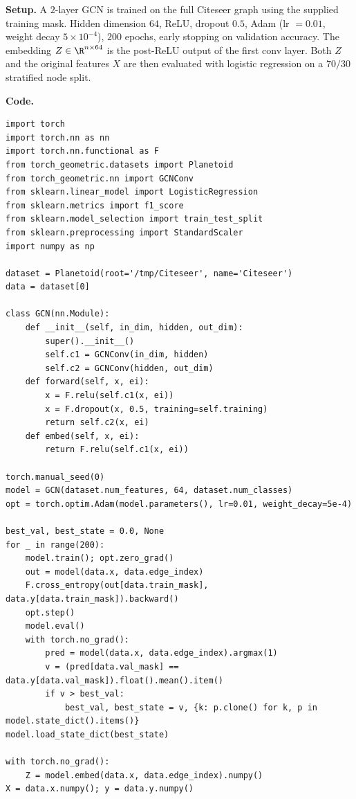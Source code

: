 \documentclass{article}
\begin{document}
\begin{tcolorbox}[colback=white, colframe=black!75, breakable, title=\textbf{Solution to Exercise 1}]
\textbf{Setup.} A $2$-layer GCN is trained on the full Citeseer graph using the supplied training mask. Hidden dimension $64$, ReLU, dropout $0.5$, Adam (lr $=0.01$, weight decay $5\times 10^{-4}$), $200$ epochs, early stopping on validation accuracy. The embedding $Z\in\R^{n\times 64}$ is the post-ReLU output of the first conv layer. Both $Z$ and the original features $X$ are then evaluated with logistic regression on a $70/30$ stratified node split.

\medskip
\textbf{Code.}
\begin{lstlisting}[style=python2]
import torch
import torch.nn as nn
import torch.nn.functional as F
from torch_geometric.datasets import Planetoid
from torch_geometric.nn import GCNConv
from sklearn.linear_model import LogisticRegression
from sklearn.metrics import f1_score
from sklearn.model_selection import train_test_split
from sklearn.preprocessing import StandardScaler
import numpy as np

dataset = Planetoid(root='/tmp/Citeseer', name='Citeseer')
data = dataset[0]

class GCN(nn.Module):
    def __init__(self, in_dim, hidden, out_dim):
        super().__init__()
        self.c1 = GCNConv(in_dim, hidden)
        self.c2 = GCNConv(hidden, out_dim)
    def forward(self, x, ei):
        x = F.relu(self.c1(x, ei))
        x = F.dropout(x, 0.5, training=self.training)
        return self.c2(x, ei)
    def embed(self, x, ei):
        return F.relu(self.c1(x, ei))

torch.manual_seed(0)
model = GCN(dataset.num_features, 64, dataset.num_classes)
opt = torch.optim.Adam(model.parameters(), lr=0.01, weight_decay=5e-4)

best_val, best_state = 0.0, None
for _ in range(200):
    model.train(); opt.zero_grad()
    out = model(data.x, data.edge_index)
    F.cross_entropy(out[data.train_mask], data.y[data.train_mask]).backward()
    opt.step()
    model.eval()
    with torch.no_grad():
        pred = model(data.x, data.edge_index).argmax(1)
        v = (pred[data.val_mask] == data.y[data.val_mask]).float().mean().item()
        if v > best_val:
            best_val, best_state = v, {k: p.clone() for k, p in model.state_dict().items()}
model.load_state_dict(best_state)

with torch.no_grad():
    Z = model.embed(data.x, data.edge_index).numpy()
X = data.x.numpy(); y = data.y.numpy()


\end{lstlisting}
\end{tcolorbox}
\end{document}
